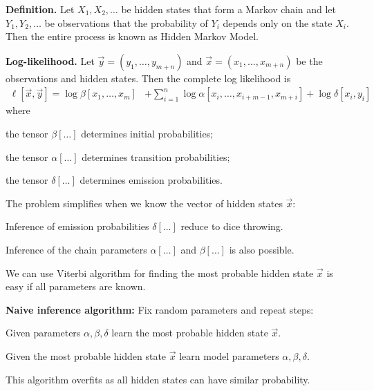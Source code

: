 \documentclass[landscape,footrule]{foils}
\begin{document}

\textbf{Definition.}
Let $X_1,X_2,\ldots$ be hidden states that form a Markov chain and let $Y_1,Y_2,\ldots$ be observations that the probability of $Y_i$ depends only on the state $X_i$. Then the entire process is known as Hidden Markov Model.

\textbf{Log-likelihood.} Let $\vec{y}=(y_1,\ldots, y_{m+n})$ and $\vec{x}=(x_1,\ldots, x_{m+n})$ be the  observations and hidden states. Then the complete log likelihood is
\begin{align*}
\ell[\vec{x},\vec{y}]=\log \beta[x_1,\ldots,x_m] &+ \sum_{i=1}^n \log \alpha[x_i,\ldots, x_{i+m-1}, x_{m+i}] 
+\log \delta[x_i,y_i]
\end{align*}
where 
\begin{triangles}
\item the tensor $\beta[\ldots]$ determines initial probabilities;
\item the tensor $\alpha[\ldots]$ determines transition probabilities;
\item the tensor $\delta[\ldots]$ determines emission probabilities.
\end{triangles}



The problem simplifies when we know the vector of hidden states $\vec{x}$: 
\begin{triangles}
\item Inference of emission probabilities $\delta[\ldots]$ reduce to dice throwing.
\item Inference of the chain parameters $\alpha[\ldots]$ and $\beta[\ldots]$ is also possible.
\end{triangles}
\vspace*{2ex}

We can use Viterbi algorithm for finding the most probable hidden state $\vec{x}$ is easy if all parameters are known.
\vspace*{2ex}


\textbf{Naive inference algorithm:} Fix random parameters and repeat steps:
\begin{triangles}
\item Given parameters $\alpha, \beta, \delta$  learn the most probable hidden state $\vec{x}$.
\item Given the most probable hidden state $\vec{x}$ learn model parameters $\alpha, \beta, \delta$.
\end{triangles}
\vspace*{2ex}
This algorithm overfits as all hidden states can have similar probability. 
\end{document}
